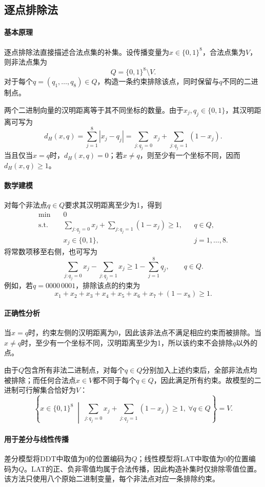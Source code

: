 \subsection{逐点排除法}
\label{subsec:lab4-point-exclusion}

\paragraph{基本原理}

逐点排除法直接描述合法点集的补集。设传播变量为$x\in\{0,1\}^8$，合法点集为$V$，则非法点集为
\[
Q=\{0,1\}^8\setminus V.
\]
对于每个$q=(q_1,\ldots,q_8)\in Q$，构造一条约束排除该点，同时保留与$q$不同的二进制点。

两个二进制向量的汉明距离等于其不同坐标的数量。由于$x_j,q_j\in\{0,1\}$，其汉明距离可写为
\[
d_H(x,q)
=\sum_{j=1}^{8}|x_j-q_j|
=\sum_{j:q_j=0}x_j+\sum_{j:q_j=1}(1-x_j).
\]
当且仅当$x=q$时，$d_H(x,q)=0$；若$x\ne q$，则至少有一个坐标不同，因而$d_H(x,q)\ge1$。

\paragraph{数学建模}

对每个非法点$q\in Q$要求其汉明距离至少为1，得到
\[
\begin{aligned}
\min\quad &0\\
\text{s.t.}\quad
&\sum_{j:q_j=0}x_j+\sum_{j:q_j=1}(1-x_j)\ge1,
&&q\in Q,\\
&x_j\in\{0,1\},
&&j=1,\ldots,8.
\end{aligned}
\]
将常数项移至右侧，也可写为
\[
\sum_{j:q_j=0}x_j-\sum_{j:q_j=1}x_j
\ge1-\sum_{j=1}^{8}q_j,
\qquad q\in Q.
\]
例如，若$q=0000\,0001$，排除该点的约束为
\[
x_1+x_2+x_3+x_4+x_5+x_6+x_7+(1-x_8)\ge1.
\]

\paragraph{正确性分析}

当$x=q$时，约束左侧的汉明距离为0，因此该非法点不满足相应约束而被排除。当$x\ne q$时，至少有一个坐标不同，汉明距离至少为1，所以该约束不会排除$q$以外的点。

由于$Q$包含所有非法二进制点，对每个$q\in Q$分别加入上述约束后，全部非法点均被排除；而任何合法点$x\in V$都不同于每个$q\in Q$，因此满足所有约束。故模型的二进制可行解集合恰好为$V$：
\[
\left\{
x\in\{0,1\}^8\;\middle|\;
\sum_{j:q_j=0}x_j+\sum_{j:q_j=1}(1-x_j)\ge1,
\ \forall q\in Q
\right\}=V.
\]

\paragraph{用于差分与线性传播}

差分模型将DDT中取值为0的位置编码为$Q$；线性模型将LAT中取值为0的位置编码为$Q$。LAT的正、负非零值均属于合法传播，因此构造补集时仅排除零值位置。该方法只使用八个原始二进制变量，每个非法点对应一条排除约束。
